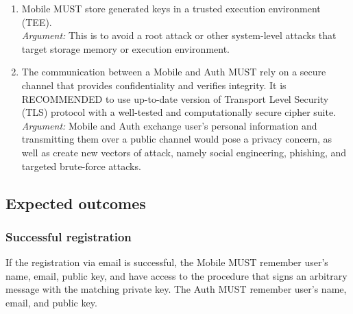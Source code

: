 \begin{enumerate}
            \item Mobile MUST store generated keys in a trusted execution environment (TEE).\\        
            \textit{Argument:} This is to avoid a root attack or other system-level attacks that target storage 
                            memory or execution environment.

            \item The communication between a Mobile and Auth MUST rely on a secure channel that provides 
                confidentiality and verifies integrity. It is RECOMMENDED to use up-to-date version of 
                Transport Level Security (TLS) protocol with a well-tested and computationally secure 
                cipher suite.\\      
            \textit{Argument:} Mobile and Auth exchange user's personal information and transmitting them over a 
                            public channel would pose a privacy concern, as well as create new vectors of attack, 
                            namely social engineering, phishing, and targeted brute-force attacks.
        \end{enumerate}
    
    \subsection{Expected outcomes}
        \subsubsection{Successful registration}
        If the registration via email is successful, the Mobile MUST remember user's name, email, public key, and 
        have access to the procedure that signs an arbitrary message with the matching private key. The Auth MUST 
        remember user's name, email, and public key.

